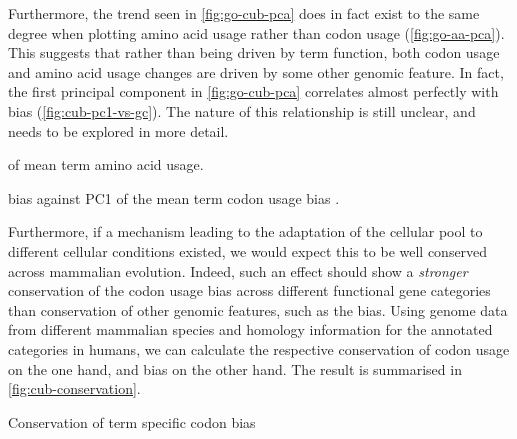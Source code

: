 
Furthermore, the trend seen in \cref{fig:go-cub-pca} does in fact exist to the
same degree when plotting amino acid usage rather than codon usage
(\cref{fig:go-aa-pca}). This suggests that rather than being driven by \go term
function, both codon usage and amino acid usage changes are driven by some other
genomic feature. In fact, the first principal component in \cref{fig:go-cub-pca}
correlates almost perfectly with \gc bias (\cref{fig:cub-pc1-vs-gc}). The nature
of this relationship is still unclear, and needs to be explored in more detail.

    {\pca of mean \go term amino acid usage.}
    {}

    {\gc bias against PC1 of the mean \go term codon usage bias \pca.}
    {}

Furthermore, if a mechanism leading to the adaptation of the cellular \trna pool
to different cellular conditions existed, we would expect this to be well
conserved across mammalian evolution. Indeed, such an effect should show a
\emph{stronger} conservation of the codon usage bias across different functional
gene categories than conservation of other genomic features, such as the \gc
bias. Using genome data from different mammalian species and homology
information for the annotated \go categories in humans, we can calculate the
respective conservation of codon usage on the one hand, and \gc bias on the
other hand. The result is summarised in \cref{fig:cub-conservation}.

    {Conservation of \go term specific codon bias}
    {}
